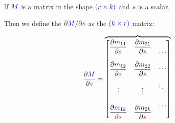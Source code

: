         \begin{definition}
            If $\textcolor{blue}{M}$ is a matrix in the shape $\textcolor{blue}{ (r \times k) }$ and $\textcolor{red}{s}$ is a scalar,
            
            Then we define the  ${\partial  \textcolor{blue}{M} }/{\partial  \textcolor{red}{s} }$ as the $\textcolor{blue}{ (k \times r) }$ matrix:
            
            \begin{equation*}
                \pderiv{ \blu{M} }{ \red{s} } 
                =
                \overbrace{
                    \begin{bmatrix}
                        \begin{matrix}
                            \bigpderiv{ \blu{m}_{11} }   { \red{s} }\\ 
                            \\
                            \bigpderiv{ \blu{m}_{12} }   { \red{s} }\\ 
                            \\
                            \vdots \\ 
                            \\
                            \bigpderiv{ \blu{m}_{1k} }   { \red{s} }
                        \end{matrix} 
                        &
                        \begin{matrix}
                            \bigpderiv{ \blu{m}_{21} }   { \red{s} }\\ 
                            \\
                            \bigpderiv{ \blu{m}_{22} }   { \red{s} }\\ 
                            \\
                            \vdots \\ 
                            \\
                            \bigpderiv{ \blu{m}_{2k} }   { \red{s} }
                        \end{matrix}
                        &
                        \begin{matrix}
                            \cdots\\\\ \cdots \\\\ \ddots \\\\ \cdots
                        \end{matrix} 

\end{bmatrix}}
\end{equation*}
\end{definition}
